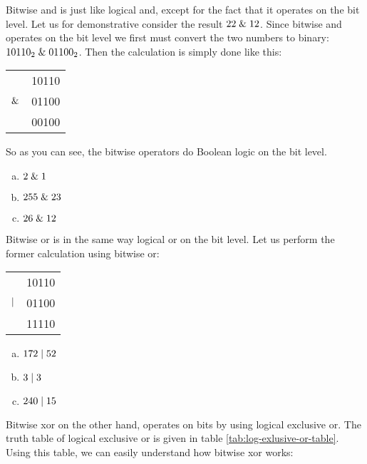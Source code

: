 Bitwise and is just like logical and, except for the fact that it
operates on the bit level. Let us for demonstrative consider the
result $22 \mathrel{\&} 12$. Since bitwise and operates on the bit level we
first must convert the two numbers to binary:\mbox{ $\mbox{\ensuremath{10110_2}}
  \mathrel{\&} \mbox{\ensuremath{01100_2}}$}. Then the calculation is simply done like
this:

\begin{center}
  \begin{tabular}{lr}
    & 10110  \\
    $\mathrel{\&}$ & 01100 \\
    \hline
    & 00100 \\
  \end{tabular}
\end{center}

So as you can see, the bitwise operators do Boolean logic on the bit
level.

\begin{Exercise}[label={bitand}]

  \begin{enumerate}[(a)]
  \item $2 \mathrel{\&} 1$
  \item $255 \mathrel{\&} 23$
  \item $26 \mathrel{\&} 12$
  \end{enumerate}
\end{Exercise}

Bitwise or is in the same way logical or on the bit level. Let us
perform the former calculation using bitwise or:

\begin{center}
  \begin{tabular}{lr}
    & 10110  \\
    $\mathrel{|}$ & 01100 \\
    \hline
    & 11110 \\
  \end{tabular}
\end{center}

\begin{Exercise}[label={bitor}]
  \begin{enumerate}[(a)]
  \item $172 \mathrel{|} 52$
  \item $3 \mathrel{|} 3$
  \item $240 \mathrel{|} 15$
  \end{enumerate}
\end{Exercise}

Bitwise xor on the other hand, operates on bits by using logical
exclusive or. The truth table of logical exclusive or is given in
table \ref{tab:log-exlusive-or-table}. Using this table, we can easily
understand how bitwise xor works:

